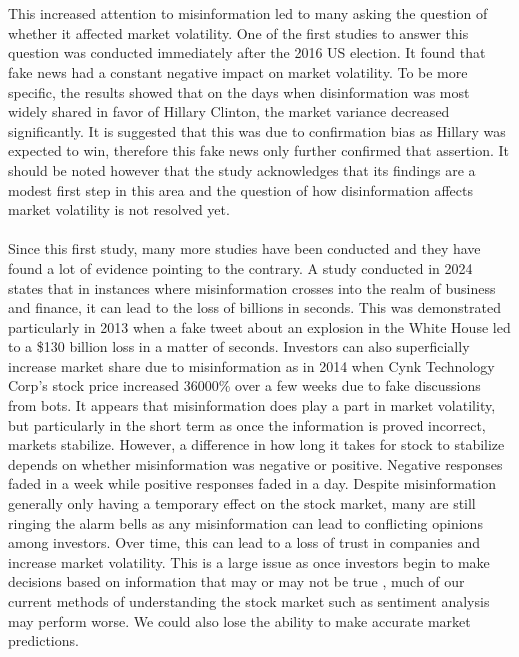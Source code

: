 \documentclass{article}
\begin{document}
\\\\
This increased attention to misinformation led to many asking the question of whether it affected market volatility. One of the first studies to answer this question was conducted immediately after the 2016 US election. It found that fake news had a constant negative impact on market volatility. \cite{source32} To be more specific, the results showed that on the days when disinformation was most widely shared in favor of Hillary Clinton, the market variance decreased significantly. \cite{source32} It is suggested that this was due to confirmation bias as Hillary was expected to win, therefore this fake news only further confirmed that assertion. \cite{source32} It should be noted however that the study acknowledges that its findings are a modest first step in this area and the question of how disinformation affects market volatility is not resolved yet.
\\\\
Since this first study, many more studies have been conducted and they have found a lot of evidence pointing to the contrary. A study conducted in 2024 states that in instances where misinformation crosses into the realm of business and finance, it can lead to the loss of billions in seconds. \cite{source31} This was demonstrated particularly in 2013 when a fake tweet about an explosion in the White House led to a \$130 billion loss in a matter of seconds.\cite{source33, source34} Investors can also superficially increase market share due to misinformation as in 2014 when Cynk Technology Corp's stock price increased 36000\% over a few weeks due to fake discussions from bots.\cite{source34} It appears that misinformation does play a part in market volatility, but particularly in the short term as once the information is proved incorrect, markets stabilize. \cite{source31} However, a difference in how long it takes for stock to stabilize depends on whether misinformation was negative or positive. Negative responses faded in a week while positive responses faded in a day. \cite{source31} Despite misinformation generally only having a temporary effect on the stock market, many are still ringing the alarm bells as any misinformation can lead to conflicting opinions among investors. \cite{source31, source35} Over time, this can lead to a loss of trust in companies and increase market volatility. \cite{source31, source35} This is a large issue as once investors begin to make decisions based on information that may or may not be true \cite{source31}, much of our current methods of understanding the stock market such as sentiment analysis may perform worse. We could also lose the ability to make accurate market predictions. 
\end{document}
